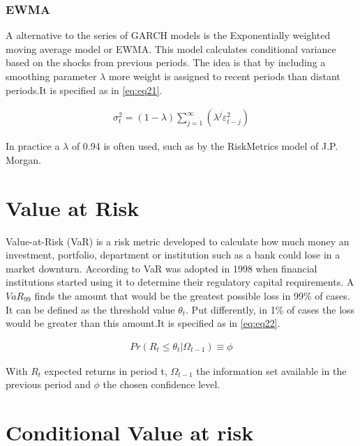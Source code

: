 \documentclass[a4paper, twoside]{templates/ociamthesis}
\begin{document}
\hypertarget{ewma}{%
\subsubsection{EWMA}\label{ewma}}

A alternative to the series of GARCH models is the Exponentially weighted moving average model or EWMA. This model calculates conditional variance based on the shocks from previous periods. The idea is that by including a smoothing parameter \(\lambda\) more weight is assigned to recent periods than distant periods.It is specified as in \eqref{eq:eq21}.

\begin{align}
\sigma_t^2 = (1-\lambda) \sum\limits_{j=1}^\infty (\lambda^j \varepsilon_{t-j}^2)
 \label{eq:eq21}
\end{align}

In practice a \(\lambda\) of 0.94 is often used, such as by the RiskMetrics model of J.P. Morgan.

\hypertarget{value-at-risk}{%
\section{Value at Risk}\label{value-at-risk}}

Value-at-Risk (VaR) is a risk metric developed to calculate how much money an investment, portfolio, department or institution such as a bank could lose in a market downturn. According to \textcite{Holton2002} VaR was adopted in 1998 when financial institutions started using it to determine their regulatory capital requirements. A \(VaR_{99}\) finds the amount that would be the greatest possible loss in 99\% of cases. It can be defined as the threshold value \(\theta_t\). Put differently, in 1\% of cases the loss would be greater than this amount.It is specified as in \eqref{eq:eq22}.

\begin{align}
Pr(R_t \le \theta_t | \Omega_{t-1}) \equiv \phi
 \label{eq:eq22}
\end{align}

With \(R_t\) expected returns in period t, \(\Omega_{t-1}\) the information set available in the previous period and \(\phi\) the chosen confidence level.

\hypertarget{conditional-value-at-risk}{%
\section{Conditional Value at risk}\label{conditional-value-at-risk}}
\end{document}
